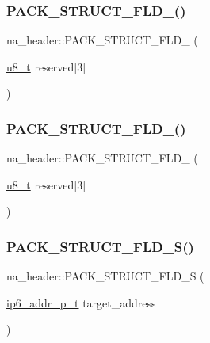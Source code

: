 \subsubsection{\texorpdfstring{P\+A\+C\+K\+\_\+\+S\+T\+R\+U\+C\+T\+\_\+\+F\+L\+D\+\_()}{PACK\_STRUCT\_FLD\_8()}\hspace{0.1cm}{\footnotesize\ttfamily [7/8]}}
{\footnotesize\ttfamily na\+\_\+header\+::\+P\+A\+C\+K\+\_\+\+S\+T\+R\+U\+C\+T\+\_\+\+F\+L\+D\+\_ (\begin{DoxyParamCaption}\item[{\hyperlink{group__compiler__abstraction_ga4caecabca98b43919dd11be1c0d4cd8e}{u8\+\_\+t}}]{reserved\mbox{[}3\mbox{]} }\end{DoxyParamCaption})}

\mbox{\label{structna__header_aeafa2cf21dabf0a59da2640db4a9aacb}} 
\subsubsection{\texorpdfstring{P\+A\+C\+K\+\_\+\+S\+T\+R\+U\+C\+T\+\_\+\+F\+L\+D\+\_()}{PACK\_STRUCT\_FLD\_8()}\hspace{0.1cm}{\footnotesize\ttfamily [8/8]}}
{\footnotesize\ttfamily na\+\_\+header\+::\+P\+A\+C\+K\+\_\+\+S\+T\+R\+U\+C\+T\+\_\+\+F\+L\+D\+\_ (\begin{DoxyParamCaption}\item[{\hyperlink{group__compiler__abstraction_ga4caecabca98b43919dd11be1c0d4cd8e}{u8\+\_\+t}}]{reserved\mbox{[}3\mbox{]} }\end{DoxyParamCaption})}

\mbox{\label{structna__header_ac6055f058c928dca86a74d6035d175cb}} 
\subsubsection{\texorpdfstring{P\+A\+C\+K\+\_\+\+S\+T\+R\+U\+C\+T\+\_\+\+F\+L\+D\+\_\+\+S()}{PACK\_STRUCT\_FLD\_S()}\hspace{0.1cm}{\footnotesize\ttfamily [1/2]}}
{\footnotesize\ttfamily na\+\_\+header\+::\+P\+A\+C\+K\+\_\+\+S\+T\+R\+U\+C\+T\+\_\+\+F\+L\+D\+\_\+S (\begin{DoxyParamCaption}\item[{\hyperlink{native_2lwip_2src_2include_2lwip_2prot_2ip6_8h_a560932a657f17ec5a0a3a78a1ce7e60a}{ip6\+\_\+addr\+\_\+p\+\_\+t}}]{target\+\_\+address }\end{DoxyParamCaption})}

